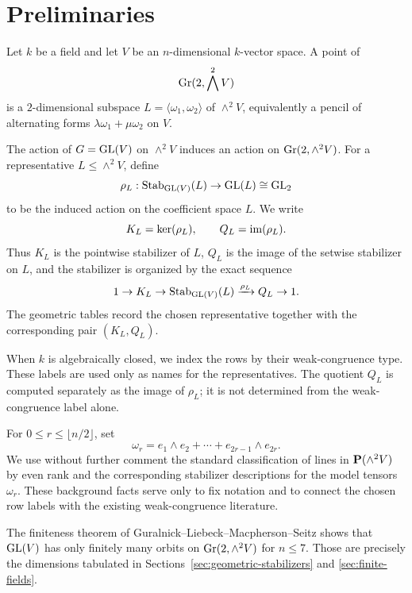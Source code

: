 \section{Preliminaries}
\label{sec:preliminaries}

Let \(k\) be a field and let \(V\) be an \(n\)-dimensional \(k\)-vector space.
A point of
\[
  \mathrm{Gr}(2,\bigwedge^{2} V)
\]
is a \(2\)-dimensional subspace \(L=\langle \omega_1,\omega_2\rangle\) of
\(\wedge^2 V\), equivalently a pencil of alternating forms
\(\lambda\omega_1+\mu\omega_2\) on \(V\).

The action of \(G=\mathrm{GL}(V)\) on \(\wedge^2 V\) induces an action on
\(\mathrm{Gr}(2,\wedge^2 V)\). For a representative \(L\le \wedge^2 V\), define
\[
  \rho_L:\mathrm{Stab}_{\mathrm{GL}(V)}(L)\to \mathrm{GL}(L)\cong \mathrm{GL}_2
\]
to be the induced action on the coefficient space \(L\). We write
\[
  K_L=\ker(\rho_L),
  \qquad
  Q_L=\mathrm{im}(\rho_L).
\]
Thus \(K_L\) is the pointwise stabilizer of \(L\), \(Q_L\) is the image of the
setwise stabilizer on \(L\), and the stabilizer is organized by the exact
sequence
\[
  1\to K_L\to \mathrm{Stab}_{\mathrm{GL}(V)}(L)\xrightarrow{\rho_L} Q_L\to 1.
\]
The geometric tables record the chosen representative together with the
corresponding pair \((K_L,Q_L)\).

When \(k\) is algebraically closed, we index the rows by their weak-congruence
type. These labels are used only as names for the representatives. The quotient
\(Q_L\) is computed separately as the image of \(\rho_L\); it is not determined
from the weak-congruence label alone.

For \(0\le r\le \lfloor n/2\rfloor\), set
\[
  \omega_r=e_1\wedge e_2+\cdots+e_{2r-1}\wedge e_{2r}.
\]
We use without further comment the standard classification of lines in
\(\mathbf P(\wedge^2 V)\) by even rank and the corresponding stabilizer
descriptions for the model tensors \(\omega_r\). These background facts serve
only to fix notation and to connect the chosen row labels with the existing
weak-congruence literature.

The finiteness theorem of Guralnick--Liebeck--Macpherson--Seitz
\cite{GLMS1997} shows that \(\mathrm{GL}(V)\) has only finitely many orbits on
\(\mathrm{Gr}(2,\wedge^2 V)\) for \(n\le 7\). Those are precisely the dimensions
tabulated in Sections~\ref{sec:geometric-stabilizers} and
\ref{sec:finite-fields}.
